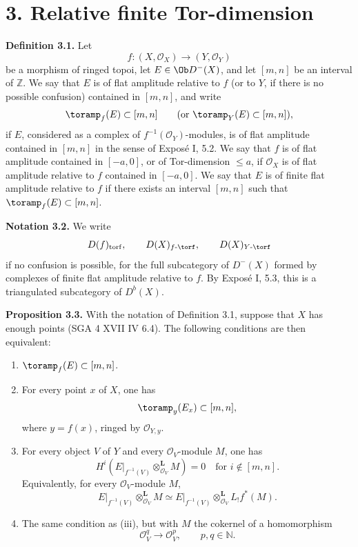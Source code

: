 \section*{3. Relative finite Tor-dimension}

\textbf{Definition 3.1.} Let
\[
  f:(X,\mathcal O_X)\longrightarrow (Y,\mathcal O_Y)
\]
be a morphism of ringed topoi, let \(E\in\Ob D^{-}(X)\), and let \([m,n]\) be an interval of \(\mathbb Z\). We say that \(E\) is of flat amplitude relative to \(f\) (or to \(Y\), if there is no possible confusion) contained in \([m,n]\), and write
\[
  \toramp_f(E)\subset [m,n]\qquad(\text{or }\toramp_Y(E)\subset [m,n]),
\]
if \(E\), considered as a complex of \(f^{-1}(\mathcal O_Y)\)-modules, is of flat amplitude contained in \([m,n]\) in the sense of Exposé I, 5.2. We say that \(f\) is of flat amplitude contained in \([-a,0]\), or of Tor-dimension \(\leq a\), if \(\mathcal O_X\) is of flat amplitude relative to \(f\) contained in \([-a,0]\). We say that \(E\) is of finite flat amplitude relative to \(f\) if there exists an interval \([m,n]\) such that \(\toramp_f(E)\subset[m,n]\).

\textbf{Notation 3.2.} We write
\[
  D(f)_{\mathrm{torf}},\qquad D(X)_{f\text{-}\torf},\qquad D(X)_{Y\text{-}\torf}
\]
if no confusion is possible, for the full subcategory of \(D^{-}(X)\) formed by complexes of finite flat amplitude relative to \(f\). By Exposé I, 5.3, this is a triangulated subcategory of \(D^b(X)\).

\textbf{Proposition 3.3.} With the notation of Definition 3.1, suppose that \(X\) has enough points (SGA 4 XVII IV 6.4). The following conditions are then equivalent:
\begin{enumerate}[label=(\roman*)]
\item \(\toramp_f(E)\subset[m,n]\).
\item For every point \(x\) of \(X\), one has
\[
  \toramp_y(E_x)\subset[m,n],
\]
where \(y=f(x)\), ringed by \(\mathcal O_{Y,y}\).
\item For every object \(V\) of \(Y\) and every \(\mathcal O_V\)-module \(M\), one has
\[
  H^i\left(E\vert_{f^{-1}(V)}
  \otimes_{\mathcal O_V}^{\mathbf L}M\right)=0
  \quad\text{for }i\notin[m,n].
\]
Equivalently, for every \(\mathcal O_V\)-module \(M\),
\[
  E\vert_{f^{-1}(V)}\otimes_{\mathcal O_V}^{\mathbf L}M
  \simeq E\vert_{f^{-1}(V)}\otimes_{\mathcal O_V}^{\mathbf L}L_!f^*(M).
\]
\item The same condition as (iii), but with \(M\) the cokernel of a homomorphism
\[
  \mathcal O_V^q\longrightarrow \mathcal O_V^p,
  \qquad p,q\in\mathbb N.
\]
\end{enumerate}

